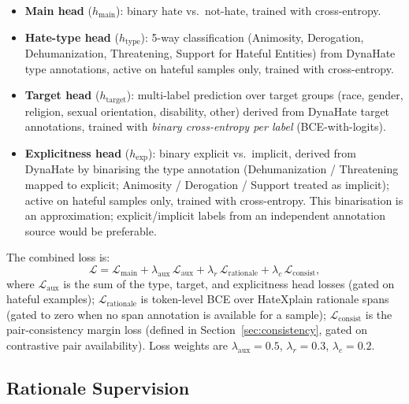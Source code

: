 \documentclass{article}
\begin{document}
\begin{itemize}
  \item \textbf{Main head} ($h_\text{main}$): binary hate vs.\ not-hate,
    trained with cross-entropy.
  \item \textbf{Hate-type head} ($h_\text{type}$): 5-way classification
    (Animosity, Derogation, Dehumanization, Threatening, Support for Hateful
    Entities) from DynaHate type annotations, active on hateful samples only,
    trained with cross-entropy.
  \item \textbf{Target head} ($h_\text{target}$): multi-label prediction over
    target groups (race, gender, religion, sexual orientation, disability,
    other) derived from DynaHate target annotations, trained with
    \emph{binary cross-entropy per label} (BCE-with-logits).
  \item \textbf{Explicitness head} ($h_\text{exp}$): binary explicit
    vs.\ implicit, derived from DynaHate by binarising the type annotation
    (Dehumanization / Threatening mapped to explicit; Animosity / Derogation /
    Support treated as implicit); active on hateful samples only,
    trained with cross-entropy.
    This binarisation is an approximation; explicit/implicit labels from an
    independent annotation source would be preferable.
\end{itemize}

\noindent The combined loss is:
\begin{equation}
  \mathcal{L} = \mathcal{L}_\text{main}
               + \lambda_\text{aux}\,\mathcal{L}_\text{aux}
               + \lambda_r\,\mathcal{L}_\text{rationale}
               + \lambda_c\,\mathcal{L}_\text{consist},
  \label{eq:loss}
\end{equation}
where $\mathcal{L}_\text{aux}$ is the sum of the type, target, and explicitness
head losses (gated on hateful examples);
$\mathcal{L}_\text{rationale}$ is token-level BCE over HateXplain rationale
spans (gated to zero when no span annotation is available for a sample);
$\mathcal{L}_\text{consist}$ is the pair-consistency margin loss (defined in
Section~\ref{sec:consistency}, gated on contrastive pair availability).
Loss weights are $\lambda_\text{aux}=0.5$, $\lambda_r=0.3$, $\lambda_c=0.2$.

\subsection{Rationale Supervision}
\label{sec:rationale}
\end{document}
